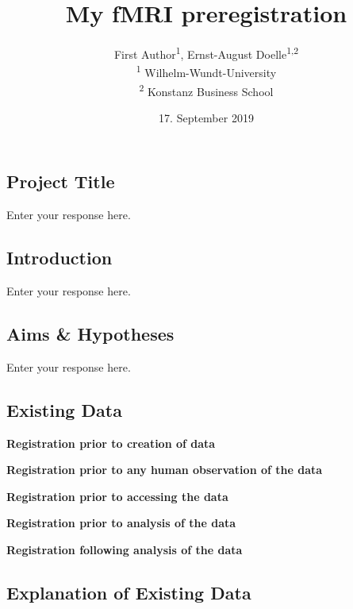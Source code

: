 \documentclass[]{article}
\title{My fMRI preregistration}
\author{
          First Author\textsuperscript{1},
          Ernst-August Doelle\textsuperscript{1,2}          \\ \vspace{0.5cm}
              \textsuperscript{1} Wilhelm-Wundt-University\\
              \textsuperscript{2} Konstanz Business School      }
\date{17. September 2019}
\newcounter{question}
\begin{document}
\maketitle
\vspace{2pc}


\newcommand\Question[2]{%
   \leavevmode\par
   \stepcounter{question}
   \noindent
   \textbf{\thequestion. #1}. #2\par}

\newcommand\Answer[1]{%
    \noindent
    \textit{Registered response}: #1\par}
    
\hypertarget{project-title}{%
\subsection{Project Title}\label{project-title}}

Enter your response here.

\hypertarget{introduction}{%
\subsection{Introduction}\label{introduction}}

Enter your response here.

\hypertarget{aims-hypotheses}{%
\subsection{Aims \& Hypotheses}\label{aims-hypotheses}}

Enter your response here.

\hypertarget{existing-data}{%
\subsection{Existing Data}\label{existing-data}}

\textbf{Registration prior to creation of data}

\textbf{Registration prior to any human observation of the data}

\textbf{Registration prior to accessing the data}

\textbf{Registration prior to analysis of the data}

\textbf{Registration following analysis of the data}

\hypertarget{explanation-of-existing-data}{%
\subsection{Explanation of Existing
Data}\label{explanation-of-existing-data}}
\end{document}
